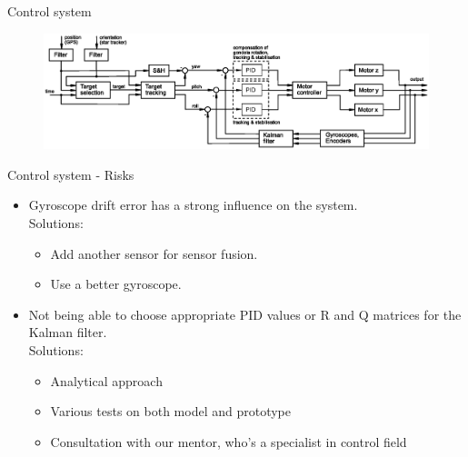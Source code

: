 \documentclass[11pt, aspectratio=169]{beamer}
\begin{document}
\begin{frame}[c]{Control system}
    \begin{figure}
        \includegraphics[width=\linewidth]{figures/images/Control_loop_v2.eps}
    \end{figure}
\end{frame}

\begin{frame}[c]{Control system - Risks}
    \begin{itemize}
        \item Gyroscope drift error has a strong influence on the system.\\
         Solutions: 
        \begin{itemize}
            \item Add another sensor for sensor fusion.
            \item Use a better gyroscope.
        \end{itemize}
        \item Not being able to choose appropriate PID values or R and Q matrices for the Kalman filter.\\
         Solutions: 
        \begin{itemize}
            \item Analytical approach
            \item Various tests on both model and prototype
            \item Consultation with our mentor, who's a specialist in control field
        \end{itemize}
    \end{itemize}
\end{frame}
\end{document}
